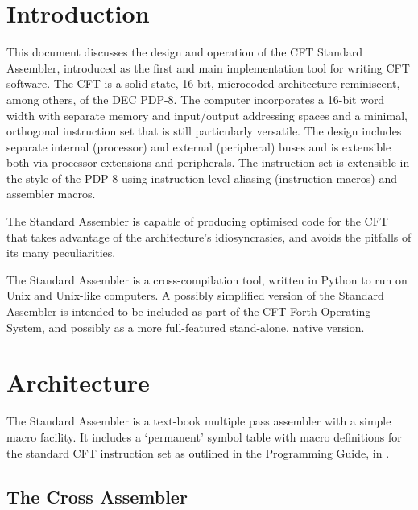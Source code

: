 
\section{Introduction}

  This document discusses the design and operation of the CFT Standard
  Assembler, introduced as the first and main implementation tool for
  writing CFT software. The CFT is a solid-state, 16-bit, microcoded
  architecture reminiscent, among others, of the DEC PDP-8. The
  computer incorporates a 16-bit word width with separate memory and
  input/output addressing spaces and a minimal, orthogonal instruction
  set that is still particularly versatile. The design includes
  separate internal (processor) and external (peripheral) buses and is
  extensible both via processor extensions and peripherals. The
  instruction set is extensible in the style of the PDP-8 using
  instruction-level aliasing (instruction macros) and assembler macros.

  The Standard Assembler is capable of producing optimised code for
  the CFT that takes advantage of the architecture's idiosyncrasies,
  and avoids the pitfalls of its many peculiarities.

  The Standard Assembler is a cross-compilation tool, written in
  Python to run on Unix and Unix-like computers. A possibly simplified
  version of the Standard Assembler is intended to be included as part
  of the CFT Forth Operating System, and possibly as a more
  full-featured stand-alone, native version.

\section{Architecture}

The Standard Assembler is a text-book multiple pass assembler with a
simple macro facility. It includes a ‘permanent’ symbol table with
macro definitions for the standard CFT instruction set as outlined in
the Programming Guide, in .

\subsection{The Cross Assembler}

